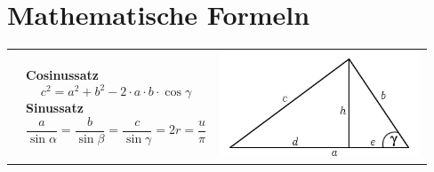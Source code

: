 \section{Mathematische Formeln}
\begin{tabular}{lll}
	& \parbox{9.5cm}{
		\textbf{Cosinussatz} \\
		$$c^2 = a^2 + b^2 - 2 \cdot a \cdot b \cdot \cos \gamma$$\\
		\textbf{Sinussatz} \\
		$$\frac{a}{\sin \alpha} = \frac{b}{\sin \beta} = \frac{c}{\sin \gamma} = 2r =
		\frac{u}{\pi}$$}
	& \parbox{8cm}{
		\includegraphics[width=6cm]{./bilder/cosinussatz.png}}
\end{tabular}